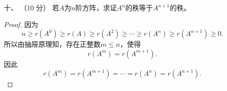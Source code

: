 \begin{enumerate}[1~]
\begin{proof}
\[V=\langle \boldsymbol{\eta} \rangle\oplus\langle \boldsymbol{\eta} \rangle^{\bot}.
\]
取$\langle \boldsymbol{\eta} \rangle^{\bot}$的一个标准正交基$\boldsymbol{\eta}_2, \boldsymbol{\eta}_3, \dots, \boldsymbol{\eta}_{n}$，得到$V$的一个标准正交基$\boldsymbol{\eta} \cdot \boldsymbol{\eta} _ { 2 } , \dots , \boldsymbol{\eta} _ { n }$。此时\[
A_{\boldsymbol{\eta}}(\boldsymbol{\eta})=-\boldsymbol{\eta}, A_{\boldsymbol{\eta}}(\boldsymbol{\eta}_i)=\boldsymbol{\eta}_i, i=2, 3, \dots, n.
\]
于是$A_{\boldsymbol{\eta}}$在$V$的标准正交基$\boldsymbol{\eta} , \boldsymbol{\eta} _ { 2 } , \dots , \boldsymbol{\eta} _ { n }$下的矩阵为\[
A=\operatorname { diag } \{ - 1,1 , \dots , 1 \}.
\]
由于$|A|=-1$，所以$A_{\boldsymbol{\eta}}$的行列式为$-1$。\\
（3）$V = V _ { \lambda } \oplus V _ { \lambda } ^ { \perp }$。
由于$\dim V_{\lambda}=n-1$，因此$\dim V_{\lambda}^{\perp}=1$，从而$V_{\lambda}^{\perp}=\langle \boldsymbol{\eta} \rangle$，其中$\boldsymbol{\eta}$是单位向量。由于$\mathscr{A}$的特征子空间$V_{\lambda}$是$\mathscr{A}$的不变子空间，因此
$V_{\lambda}^{\perp}$也是$\mathscr{A}$的不变子空间。从而$\boldsymbol{\eta}$是$\mathscr{A}$的一个特征向量。由于
$\mathscr{A}$的属于$1$的特征子空间$V_{\lambda}$的维数等于$n-1$，且正交变换$\mathscr{A}$的特征值等于$1$或$-1$，因此$\mathscr{A}(\boldsymbol{\eta})=-\boldsymbol{\eta}$。\\
从而\[
\mathscr{A}(\boldsymbol{\eta})=-\boldsymbol{\eta}=\boldsymbol{\eta}-2(\boldsymbol{\eta}, \boldsymbol{\eta})\boldsymbol{\eta}.
\]
在$V_{\lambda}$中取一个基$\boldsymbol{\alpha} _ { 1 } , \boldsymbol{\alpha} _ { 2 } , \dots , \boldsymbol{\alpha} _ { n - 1 }$，则\[
\mathscr{A}(\boldsymbol{\alpha}_i)=\boldsymbol{\alpha}_i=\boldsymbol{\alpha}_i-2(\boldsymbol{\eta}, \boldsymbol{\alpha}_i)\boldsymbol{\eta}, i=1, 2, \dots, n-1.
\]
由于$\boldsymbol{\alpha} _ { 1 } , \boldsymbol{\alpha} _ { 2 } , \dots , \boldsymbol{\alpha} _ { n - 1 } , \boldsymbol{\eta}$是$V$的一个基，因此\[
\mathscr{A}(\boldsymbol{\alpha})=\boldsymbol{\alpha}-2(\boldsymbol{\eta}, \boldsymbol{\alpha})\boldsymbol{\eta}, \text{对任意的$\boldsymbol{\alpha}\in V$}.
\]
从而$\mathscr{A}$是$V$的镜面反射。
\end{proof}
\begin{remark}
镜面反射的另一个定义：设$V$是$n$维欧几里得空间，$\boldsymbol{\eta}$是$V$中一个单位向量，$\mathscr{P}$是$V$在$\langle \boldsymbol{\eta} \rangle$上的正交投影，令\[
\mathscr { A } = \mathscr { I } - 2 \mathscr { P },
\]
则$\mathscr{A}$称为关于超平面$\langle \boldsymbol{\eta} \rangle^{\perp}$的镜面反射。
\end{remark}

\item[十、]（10 分）
若$A$为$n$阶方阵，求证$A^n$的秩等于$A^{n+1}$的秩。
\begin{proof}
因为\[
n\ge r(A^0)\ge r(A)\ge r(A^2)\ge \cdots\ge r(A^n)\ge r(A^{n+1})\ge0.
\]
所以由抽屉原理知，存在正整数$m\le n$，使得\[
r(A^m)=r(A^{m+1}).
\]
因此\[
r(A^m)=r(A^{m+1})=\cdots=r(A^n)=r(A^{n+1}).
\]
\end{proof}
\end{enumerate}
\endinput